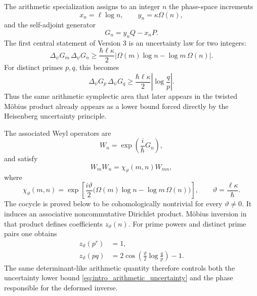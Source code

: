 \documentclass[11pt]{amsart}
\numberwithin{equation}{section}
\theoremstyle{plain}
\theoremstyle{definition}
\theoremstyle{remark}
\begin{document}
The arithmetic specialization assigns to an integer \(n\) the phase-space
increments
\begin{equation}
x_n=\ell\log n,
\qquad
y_n=\kappa\Omega(n),
\label{eq:intro_phase_space_coordinates}
\end{equation}
and the self-adjoint generator
\begin{equation}
G_n=y_nQ-x_nP.
\label{eq:intro_Gn}
\end{equation}
The first central statement of Version 3 is an uncertainty law for two
integers:
\begin{equation}
\boxed{
\Delta_\psi G_m\,\Delta_\psi G_n
\ge
\frac{\hbar\ell\kappa}{2}
\left|\Omega(m)\log n-\log m\,\Omega(n)\right|.}
\label{eq:intro_arithmetic_uncertainty}
\end{equation}
For distinct primes \(p,q\), this becomes
\begin{equation}
\boxed{
\Delta_\psi G_p\,\Delta_\psi G_q
\ge
\frac{\hbar\ell\kappa}{2}
\left|\log\frac{q}{p}\right|.}
\label{eq:intro_prime_uncertainty}
\end{equation}
Thus the same arithmetic symplectic area that later appears in the twisted
M\"obius product already appears as a lower bound forced directly by the
Heisenberg uncertainty principle.

The associated Weyl operators are
\begin{equation}
W_n=\exp\left(\frac{i}{\hbar}G_n\right),
\label{eq:intro_Wn}
\end{equation}
and satisfy
\begin{equation}
W_mW_n
=
\chi_\vartheta(m,n)W_{mn},
\label{eq:intro_twisted_product}
\end{equation}
where
\begin{equation}
\chi_\vartheta(m,n)
=
\exp\left[
\frac{i\vartheta}{2}
\bigl(\Omega(m)\log n-\log m\,\Omega(n)\bigr)
\right],
\qquad
\vartheta=\frac{\ell\kappa}{\hbar}.
\label{eq:intro_cocycle}
\end{equation}
The cocycle is proved below to be cohomologically nontrivial for every
\(\vartheta\ne0\).  It induces an associative noncommutative Dirichlet
product.  M\"obius inversion in that product defines coefficients
\(z_\vartheta(n)\).  For prime powers and distinct prime pairs one obtains
\begin{align}
z_\vartheta(p^r)&=1,
\label{eq:intro_prime_power_formula}\\
z_\vartheta(pq)
&=2\cos\left(\frac{\vartheta}{2}\log\frac{q}{p}\right)-1.
\label{eq:intro_prime_pair_formula}
\end{align}
The same determinant-like arithmetic quantity therefore controls both the
uncertainty lower bound \eqref{eq:intro_arithmetic_uncertainty} and the phase
responsible for the deformed inverse.
\end{document}
